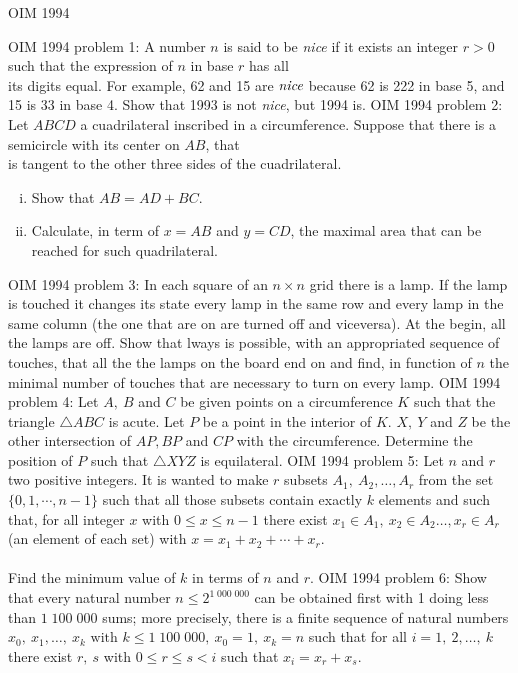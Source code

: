 OIM 1994 

OIM 1994 problem 1:  A number $n$ is said to be \textit{nice} if it exists an integer $r>0$ such that the expression of $n$ in base $r$ has all \\
its digits equal. For example, 62 and 15 are $\emph{nice}$ because 62 is 222 in base 5, and 15 is 33 in base 4. Show that 1993 is not \textit{nice}, but 1994 is. 
OIM 1994 problem 2:  Let $ ABCD$ a cuadrilateral inscribed in a circumference. Suppose that there is a semicircle with its center on $ AB$, that \\
is tangent to the other three sides of the cuadrilateral.
\begin{enumerate}[(i)]
  \item Show that $ AB = AD + BC$.
  \item Calculate, in term of $ x = AB$ and $ y = CD$, the maximal area that can be reached for such quadrilateral.
\end{enumerate} 
OIM 1994 problem 3:  In each square of an $n\times{n}$ grid there is a lamp. If the lamp is touched it changes its state every lamp in the same row and every lamp in the same column (the one that are on are turned off and viceversa). At the begin, all the lamps are off. Show that  lways is possible, with an appropriated sequence of touches, that all the the lamps on the board end on and find, in function of $n$ the minimal number of touches that are necessary to turn on every lamp. 
OIM 1994 problem 4:  Let $A,\ B$ and $C$ be given points on a circumference $K$ such that the triangle $\triangle{ABC}$ is acute. Let $P$ be a point in the interior of $K$. $X,\ Y$ and $Z$ be the other intersection of $AP, BP$ and $CP$  with the circumference. Determine the position of $P$ such that $\triangle{XYZ}$ is equilateral. 
OIM 1994 problem 5:  Let $n$ and $r$ two positive integers. It is wanted to make $r$ subsets $A_1,\ A_2,\dots,A_r$ from the set $\{0,1,\cdots,n-1\}$ such that all those subsets contain exactly $k$ elements and such that, for all integer $x$ with $0\leq{x}\leq{n-1}$ there exist $x_1\in{}A_1,\ x_2\in{}A_2 \dots,x_r\in{}A_r$ (an element of each set) with $x=x_1+x_2+\cdots+x_r$. \\\\
Find the minimum value of $k$ in terms of $n$ and $r$. 
OIM 1994 problem 6:  Show that every natural number $n\leq2^{1\;000\;000}$ can be obtained first with 1 doing less than $1\;100\;000$ sums; more precisely, there is a finite sequence of natural numbers $x_0,\ x_1,\dots,\ x_k\mbox{ with }k\leq1\;100\;000,\ x_0=1,\ x_k=n$ such that for all $i=1,\ 2,\dots,\ k$ there exist $r,\ s$ with $0\leq{r}\leq{s}<i$ such that $x_i=x_r+x_s$. 

